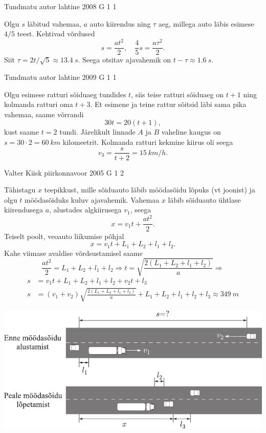 \documentclass[11pt]{article}
\begin{document}
{%
{Tundmatu autor} %
{lahtine} %
{2008} %
{G 1} %
{1} %
{

\ifSolution
Olgu $s$ läbitud vahemaa, $a$ auto kiirendus ning $\tau$ aeg, millega auto läbis esimese $4/5$ teest. Kehtivad võrdused
\[
s=\frac{a t^{2}}{2}, \quad \frac{4}{5} s=\frac{a \tau^{2}}{2}.
\]
Siit $\tau = 2t/\sqrt 5\approx \SI{13,4}{s}$. Seega otsitav ajavahemik on $t-\tau\approx \SI{1,6}{s}$.
\fi
}

{Tundmatu autor} %
{lahtine} %
{2009} %
{G 1} %
{1} %
{

\ifSolution
Olgu esimese ratturi sõiduaeg tundides $t$, siis teise ratturi sõiduaeg on $t + 1$ ning kolmanda ratturi oma $t+3$. Et esimene ja teine rattur sõitsid läbi sama pika vahemaa, saame võrrandi
\[
30 t=20(t+1),
\]
kust saame $t = \num{2}$ tundi. Järelikult linnade $A$ ja $B$ vaheline kaugus on $s = \num{30}·\num{2} = \SI{60}{km}$ kilomeetrit. Kolmanda ratturi kekmine kiirus oli seega
\[
v_{3}=\frac{s}{t+2}=\SI{15}{km/h}.
\]
\fi
}

{Valter Kiisk} %
{piirkonnavoor} %
{2005} %
{G 1} %
{2} %
{

\ifSolution
Tähistagu $x$ teepikkust, mille sõiduauto läbib möödasõidu lõpuks (vt joonist) ja olgu $t$ möödasõiduks kuluv ajavahemik. Vahemaa $x$ läbib sõiduauto ühtlase kiirendusega $a$, alustades algkiirusega $v_1$, seega
\[
x = v_1t + \frac{at^2}{2}. 
\]
Teiselt poolt, veoauto liikumise põhjal
\[
x = v_1t + L_1 + L_2 + l_1 + l_2.
\]
Kahe viimase avaldise võrdsustamisel saame
\[
\frac{a t^{2}}{2}=L_{1}+L_{2}+l_{1}+l_{2} \Rightarrow t=\sqrt{\frac{2\left(L_{1}+L_{2}+l_{1}+l_{2}\right)}{a}}\Rightarrow
\]
\[
\begin{aligned}
s &= v_1t + L_1 + L_2 + l_1 + l_2 + v_2t + l_3\\
s &= \left(v_{1}+v_{2}\right) \sqrt{\frac{2\left(L_{1}+L_{2}+l_{1}+l_{2}\right)}{a}}+L_{1}+L_{2}+l_{1}+l_{2}+l_{3} \approx \SI{349}{m}
\end{aligned}
\]

\begin{center}
	\includegraphics[width=\linewidth]{2005-v2g-01-lah}
\end{center}

}}
\end{document}
